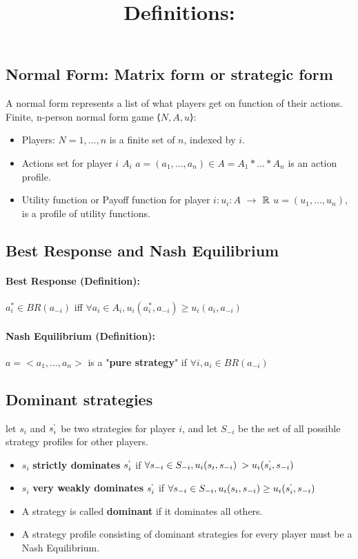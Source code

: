 \documentclass[10pt,a4paper]{report}
\begin{document}
\subsection{Normal Form: Matrix form or strategic form}
A normal form represents a list of what players get on function of their actions.
Finite, n-person normal form game  ⟨$N, A, u$⟩:
\begin{itemize}
\item Players: $ N = {1, ... , n} $ is a finite set of $n$, indexed by $i$.
\item Actions set for player $i$ $A_i$
\subitem $a = (a_1,...,a_n) \in A = A_1 * ... * A_n $ is an action profile.
\item Utility function or Payoff function for player $i: u_i : A $  $\to$ ${\Bbb{R}}$
\subitem $u = (u_1,..., u_n)$, is a profile of utility functions.
\end{itemize}
\subsection{Best Response and Nash Equilibrium}
\paragraph{Best Response (Definition):}
$a_i^* \in BR(a_{-i}) $ iff $  \forall a_i \in A_i, u_i(a_i^*,a_{-i}) \geq u_i(a_i, a_{-i})$  
\paragraph{Nash Equilibrium (Definition):}
$a = <a_1,...,a_n>$ is a "\textbf{pure strategy}" if $\forall i, a_i \in BR(a_{-i})$
\subsection{Dominant strategies}
let $s_i$ and $s_i^`$ be two strategies for player $i$, and let $S_{-i}$ be the set of all possible strategy profiles for other players.
\bigbreak
\title{\textbf{Definitions:} }
\begin{itemize}
\item $s_i$ \textbf{strictly dominates} $s_i^`$ if $\forall s_{-i} \in S_{-i}, u_i(s_i, s_{-i}) \>> u_i(s_i^`, s_{-i})$
\item $s_i$ \textbf{very weakly dominates} $s_i^`$ if $\forall s_{-i} \in S_{-i}, u_i(s_i, s_{-i}) \geq u_i(s_i^`, s_{-i})$
\item A strategy is called \textbf{dominant} if it dominates all others.
\item A strategy profile consisting of dominant strategies for every player must be a Nash Equilibrium.
\end{itemize}
\end{document}
